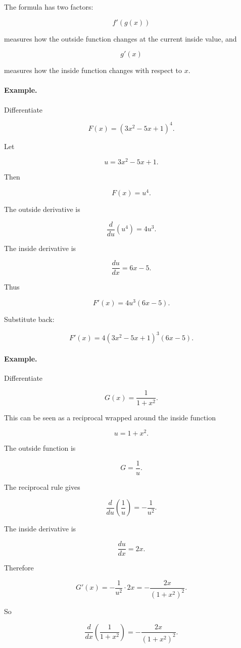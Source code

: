 The formula has two factors:

\[
f'(g(x))
\]

measures how the outside function changes at the current inside value, and

\[
g'(x)
\]

measures how the inside function changes with respect to \(x\).

\paragraph{Example.}
Differentiate

\[
F(x)=(3x^2-5x+1)^4.
\]

Let

\[
u=3x^2-5x+1.
\]

Then

\[
F(x)=u^4.
\]

The outside derivative is

\[
\frac{d}{du}(u^4)=4u^3.
\]

The inside derivative is

\[
\frac{du}{dx}=6x-5.
\]

Thus

\[
F'(x)=4u^3(6x-5).
\]

Substitute back:

\[
\boxed{
F'(x)
=
4(3x^2-5x+1)^3(6x-5).
}
\]

\paragraph{Example.}
Differentiate

\[
G(x)=\frac{1}{1+x^2}.
\]

This can be seen as a reciprocal wrapped around the inside function

\[
u=1+x^2.
\]

The outside function is

\[
G=\frac1u.
\]

The reciprocal rule gives

\[
\frac{d}{du}\left(\frac1u\right)=-\frac1{u^2}.
\]

The inside derivative is

\[
\frac{du}{dx}=2x.
\]

Therefore

\[
G'(x)
=
-\frac1{u^2}\cdot 2x
=
-\frac{2x}{(1+x^2)^2}.
\]

So

\[
\boxed{
\frac{d}{dx}\left(\frac{1}{1+x^2}\right)
=
-\frac{2x}{(1+x^2)^2}.
}
\]

